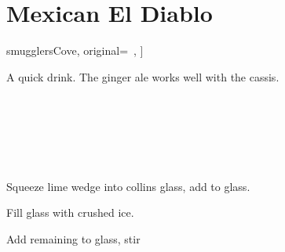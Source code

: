 \section[Mexican El Diablo]{
    Mexican El Diablo~
}

\begin{recipestats}[
        servings=1,
        preptime=5~\minute,
        source=\citeauthor{smugglersCove}~\cite[p.~43]{smugglersCove},
        original=\citeauthor{traderVicsFoodAndDrink}~\cite{traderVicsFoodAndDrink},
    ]

\end{recipestats}

\begin{recipeabstract}
    A quick drink.
    The ginger ale works well with the cassis.
\end{recipeabstract}

\begin{ingredientcolumns}
    \begin{ingredientblock}
        \\
        \\
        \\
    \end{ingredientblock}

    \begin{ingredientblock}
        \\
    \end{ingredientblock}
\end{ingredientcolumns}

\begin{preparation}
\item Squeeze lime wedge into collins glass, add to glass.
\item Fill glass with crushed ice.
\item Add remaining to glass, stir
\end{preparation}

\recipeend%
